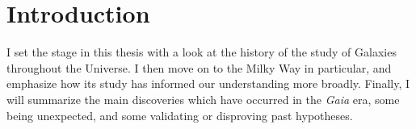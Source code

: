 \chapter{Introduction}

I set the stage in this thesis with a look at the history of the study of Galaxies throughout the Universe. I then move on to the Milky Way in particular, and emphasize how its study has informed our understanding more broadly. Finally, I will summarize the main discoveries which have occurred in the \textit{Gaia} era, some being unexpected, and some validating or disproving past hypotheses.





